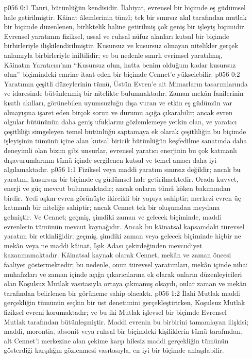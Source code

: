 \vs p056 0:1 Tanri, bütünlüğün kendisidir. İlahiyat, evrensel bir biçimde eş güdümsel hale getirilmiştir. Kâinat âlemlerinin tümü; tek bir sınırsız akıl tarafından mutlak bir biçimde düzenlenen, birliktelik haline getirilmiş çok geniş bir işleyiş biçimidir. Evrensel yaratımın fiziksel, ussal ve ruhsal nüfuz alanları kutsal bir biçimde birbirleriyle ilişkilendirilmiştir. Kusursuz ve kusursuz olmayan nitelikler gerçek anlamıyla birbirleriyle iniltilidir; ve bu nedenle sınırlı evrimsel yaratılmış, Kâinatın Yaratıcısı’nın “Kusursuz olun, hatta benim olduğum kadar kusursuz olun” biçimindeki emrine itaat eden bir biçimde Cennet’e yükselebilir.
\vs p056 0:2 Yaratımın çeşitli düzeylerinin tümü, Üstün Evren’e ait Mimarların tasarımlarında ve idaresinde bütünlenmiş bir nitelikte bulunmaktadır. Zaman\hyp{}mekân fanilerinin kısıtlı akılları, görünebilen uyumsuzluğu dışa vuran ve etkin eş güdümün var olmayışına işaret eden birçok sorun ve durumu açığa çıkarabilir; ancak evren olgular bütününün daha geniş ufuklarını gözlemlemeye yetkin olan, ve yaratıcı çeşitliliği simgeleyen temel bütünlüğü saptamaya ek olarak çeşitliliğin bu biçimde işleyişinin tümünü içine alan kutsal biricik bütünlüğün keşfedilme sanatında daha deneyimli olan bizim gibi unsurlar, evrensel yaratıcı enerjinin bu çok katmanlı dışavurumlarının tümü içinde sergilenen kutsal ve temel amacı daha iyi algılamaktadır.
\vs p056 1:1 Fiziksel veya maddi yaratım sınırsız değildir; ancak bu yaratım, kusursuz bir biçimde eş güdümsel hale getirilmektedir. Orada kuvvet, enerji ve güç mevcut bulunmaktadır; ancak onların tümü köken bakımından birdir. Yedi aşkın\hyp{}evren görünüşte ikircikli bir yapıya sahiptir; merkezi evren üç katmanlı bir niteliğe sahiptir; ancak Cennet tek bir oluşumdan meydana gelmiştir. Ve Cennet; geçmiş, şimdiki zaman ve gelecek biçiminde, maddi evrenlerin tümünün mevcut kaynağıdır. Ancak bu kâinatsal kapsamdaki türevsel yaratım bir  etkinliğidir; geçmiş, şimdiki zaman veya gelecek biçiminde hiçbir  ne mekân veya ne maddi kâinat, Işık Adası çekirdeğinden mevcudiyet kazanmamaktadır. Kâinatsal kaynak olarak Cennet, mekân ve zaman öncesi faaliyet göstermektedir; bu nedenle, onun türevsel yaratımları, mekân içinde nihai muhafızları ve zaman içinde açığa çıkarıcılarına ek olarak onların düzenleyicileri olan Koşulsuz Mutlak vasıtasıyla ortaya çıkmamış olsaydı, onlar zaman ve mekân tarafından belirlenen bir görüneme sahip olacaktı.
\vs p056 1:2 İlahi Mutlak maddi gerçekliğin tümünün seçkin bir üst denetimini gerçekleştirirken, Koşulsuz Mutlak fiziksel evreni korumaktadır; ve bu iki Mutlak işlevsel bir biçimde Evrensel Mutlak tarafından bütünleşmiştir. Maddi evrenin bu birbirini tamamlayan ilişkisi; maddi, morontia, absonit veya ruhsal bir biçimdeki kişiliklerin tümü tarafından, alt Cennet’i merkezine alan çekime karşı hilesiz maddi gerçekliğin tümünün gösterdiği karşılığın gözlenmesi vasıtasıyla, en iyi bir biçimde anlaşılabilir.
